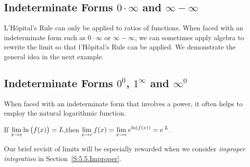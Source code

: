 \subsection{Indeterminate Forms $0\cdot\infty$ and $\infty-\infty$}

L'H\^opital's Rule can only be applied to ratios of functions. When faced with an indeterminate form such as $0 \cdot \infty$ or $\infty - \infty$, we can sometimes apply algebra to rewrite the limit so that l'H\^opital's Rule can be applied. We demonstrate the general idea in the next example.


\subsection{Indeterminate Forms $0^0$, $1^\infty$ and $\infty^0$}

When faced with an indeterminate form that involves a power, it often helps to employ the natural logarithmic function. 

{If $\displaystyle \lim_{x \to c} \ln \big( f(x) \big) = L$,\quad then 
$\displaystyle \lim_{x \to c} f(x) = \lim_{x \to c} e^{\ln( f(x) )} = e\,^L.$ 
} %


\pagebreak


Our brief revisit of limits will be especially rewarded when we consider \textit{improper integration} in Section~\ref{S:5.5.Improper}. 

